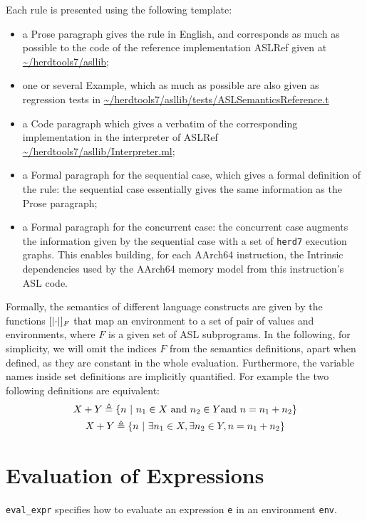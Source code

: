 \documentclass{book}
\begin{document}
Each rule is presented using the following template:
\begin{itemize}
\item a Prose paragraph gives the rule in English, and corresponds as much as possible to the code of the reference implementation ASLRef given at \url{~/herdtools7/asllib};
\item one or several Example, which as much as possible are also given as regression tests in \url{~/herdtools7/asllib/tests/ASLSemanticsReference.t}
\item a Code paragraph which gives a verbatim of the corresponding implementation in the interpreter of ASLRef \url{~/herdtools7/asllib/Interpreter.ml};
\item a Formal paragraph for the sequential case, which gives a formal
definition of the rule: the sequential case essentially gives the same
information as the Prose paragraph;
\item a Formal paragraph for the concurrent case: the concurrent case augments
the information given by the sequential case with a set of \texttt{herd7}
execution graphs. This enables building, for each AArch64 instruction, the
Intrinsic dependencies used by the AArch64 memory model from this instruction's
ASL code.
\end{itemize}
%
Formally, the semantics of different language constructs are given by the functions
$\left[| \cdot \right|]_F$ that map an environment to a set of pair of values and
environments, where $F$ is a given set of ASL subprograms.
%
In the following, for simplicity, we will omit the indices $F$ from the
semantics definitions, apart when defined, as they are constant in the whole
evaluation.
%
Furthermore, the variable names inside set definitions are implicitly
quantified. For example the two following definitions are equivalent:
%
\begin{gather*}
  X + Y \triangleq \left\{ n \ \middle|\ {} n_1 \in X \ \text{and}\ n_2 \in Y \text{and}\ n = n_1 + n_2 \right\}
  \\
  X + Y \triangleq \left\{ n \ \middle|\ {} \exists n_1 \in X, \exists n_2 \in Y, n = n_1 + n_2 \right\}
\end{gather*}


\chapter{Evaluation of Expressions \label{chap:eval_expr}}

\texttt{eval\_expr} specifies how to evaluate an expression \texttt{e} in an
environment \texttt{env}.
\end{document}
